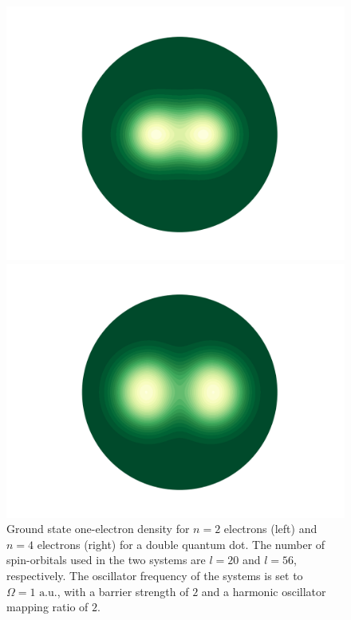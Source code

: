 \begin{figure}
    \centering
    \begin{minipage}{0.49\textwidth}
        \includegraphics[trim=4em 3.5em 4em 4em, clip=true, width=\textwidth]{results/figures/DW/rho_dw.png} 
    \end{minipage}\hfill
    \begin{minipage}{0.49\textwidth}
        \includegraphics[trim=4em 3.5em 4em 4em, clip=true, width=\textwidth]{results/figures/DW/rho_dw_n4.png} 
    \end{minipage}
    \caption{Ground state one-electron density for $n=2$ electrons (left)
        and $n=4$ electrons (right) for a double quantum dot. The number of spin-orbitals 
        used in the two systems are $l=20$ and $l=56$, respectively. The oscillator frequency 
        of the systems is set to $\Omega=1 \text{ a.u.}$, with a barrier strength of $2$ and 
        a harmonic oscillator mapping ratio of $2$.
    }
    \label{fig:2d_dw_rho}
\end{figure}


